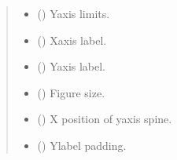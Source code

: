 \documentclass[letterpaper,10pt,english]{sphinxhowto}
\begin{document}
\begin{fulllineitems}
\begin{quote}
\begin{description}
\begin{itemize}
\item {} 
\sphinxAtStartPar
{} (\sphinxstyleliteralemphasis{\sphinxupquote{, }}\sphinxstyleliteralemphasis{\sphinxupquote{(}}\sphinxstyleliteralemphasis{\sphinxupquote{, }}\sphinxstyleliteralemphasis{\sphinxupquote{)}}) \textendash{} Y\sphinxhyphen{}axis limits.

\item {} 
\sphinxAtStartPar
{} (\sphinxstyleliteralemphasis{\sphinxupquote{, }}\sphinxstyleliteralemphasis{\sphinxupquote{ (}}\sphinxstyleliteralemphasis{\sphinxupquote{)}}) \textendash{} X\sphinxhyphen{}axis label.

\item {} 
\sphinxAtStartPar
{} (\sphinxstyleliteralemphasis{\sphinxupquote{, }}) \textendash{} Y\sphinxhyphen{}axis label.

\item {} 
\sphinxAtStartPar
{} (\sphinxstyleliteralemphasis{\sphinxupquote{, }}\sphinxstyleliteralemphasis{\sphinxupquote{(}}\sphinxstyleliteralemphasis{\sphinxupquote{, }}\sphinxstyleliteralemphasis{\sphinxupquote{)}}) \textendash{} Figure size.

\item {} 
\sphinxAtStartPar
{} (\sphinxstyleliteralemphasis{\sphinxupquote{, }}) \textendash{} X position of y\sphinxhyphen{}axis spine.

\item {} 
\sphinxAtStartPar
{} (\sphinxstyleliteralemphasis{\sphinxupquote{, }}) \textendash{} Y\sphinxhyphen{}label padding.


\end{itemize}
\end{description}
\end{quote}
\end{fulllineitems}
\end{document}
